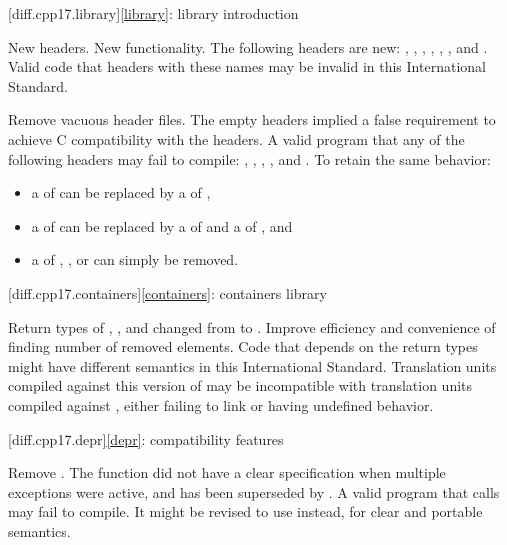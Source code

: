 [diff.cpp17.library]{\ref{library}: library introduction}

\change New headers.
\rationale New functionality.
\effect
The following \Java{} headers are new:
,
,
,
,
,
, and
.
Valid \JavaXVII{} code that  headers with these names may be
invalid in this International Standard.

\change Remove vacuous \Java{} header files.
\rationale
The empty headers implied a false requirement to achieve C compatibility with the \Java{} headers.
\effect
A valid \JavaXVII{} program that  any of the following headers may fail to compile:
,
,
,
, and
.
To retain the same behavior:
\begin{itemize}
\item
a  of  can be replaced by
a  of ,
\item
a  of  can be replaced by
a  of  and
a  of ,
and
\item
a  of
,
, or
can simply be removed.
\end{itemize}

[diff.cpp17.containers]{\ref{containers}: containers library}

\change
Return types of , , and 
changed from  to .
\rationale Improve efficiency and convenience of finding number of removed elements.
\effect
Code that depends on the return types might have different semantics in this International Standard.
Translation units compiled against this version of \Java{} may be incompatible with
translation units compiled against \JavaXVII{}, either failing to link or having undefined behavior.

[diff.cpp17.depr]{\ref{depr}: compatibility features}

\nodiffref
\change Remove .
\rationale
The function did not have a clear specification when multiple exceptions were
active, and has been superseded by .
\effect
A valid \JavaXVII{} program that calls  may fail
to compile. It might be revised to use  instead,
for clear and portable semantics.

